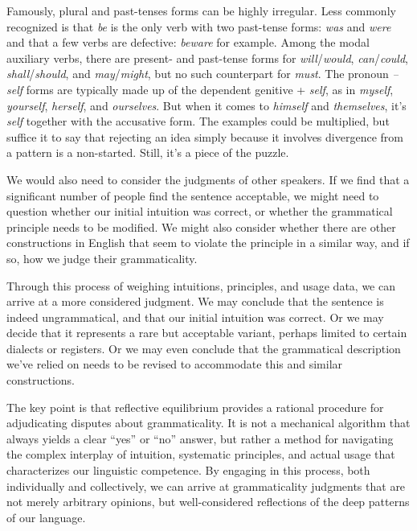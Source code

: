 Famously, plural and past-tenses forms can be highly irregular. Less commonly recognized is that \textit{be} is the only verb with two past-tense forms: \textit{was} and \textit{were} and that a few verbs are defective: \textit{beware} for example. Among the modal auxiliary verbs, there are present- and past-tense forms for \textit{will}/\textit{would}, \textit{can}/\textit{could}, \textit{shall}/\textit{should}, and \textit{may}/\textit{might}, but no such counterpart for \textit{must}. The pronoun \textit{--self} forms are typically made up of the dependent genitive + \textit{self}, as in \textit{myself}, \textit{yourself}, \textit{herself}, and \textit{ourselves}. But when it comes to \textit{himself} and \textit{themselves}, it's \textit{self} together with the accusative form. The examples could be multiplied, but suffice it to say that rejecting an idea simply because it involves divergence from a pattern is a non-started. Still, it's a piece of the puzzle.

We would also need to consider the judgments of other speakers. If we find that a significant number of people find the sentence acceptable, we might need to question whether our initial intuition was correct, or whether the grammatical principle needs to be modified. We might also consider whether there are other constructions in English that seem to violate the principle in a similar way, and if so, how we judge their grammaticality.

Through this process of weighing intuitions, principles, and usage data, we can arrive at a more considered judgment. We may conclude that the sentence is indeed ungrammatical, and that our initial intuition was correct. Or we may decide that it represents a rare but acceptable variant, perhaps limited to certain dialects or registers. Or we may even conclude that the grammatical description we've relied on needs to be revised to accommodate this and similar constructions.

The key point is that reflective equilibrium provides a rational procedure for adjudicating disputes about grammaticality. It is not a mechanical algorithm that always yields a clear ``yes'' or ``no'' answer, but rather a method for navigating the complex interplay of intuition, systematic principles, and actual usage that characterizes our linguistic competence. By engaging in this process, both individually and collectively, we can arrive at grammaticality judgments that are not merely arbitrary opinions, but well-considered reflections of the deep patterns of our language.

